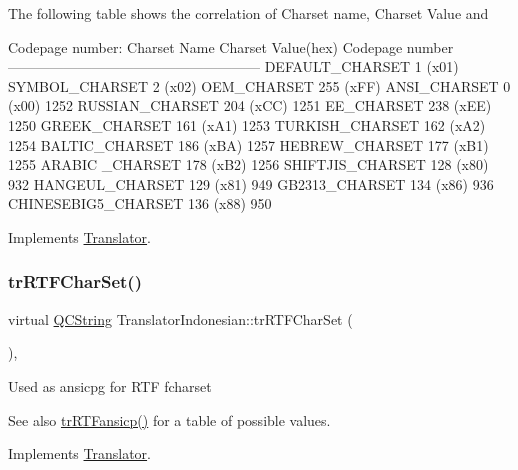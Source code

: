 The following table shows the correlation of Charset name, Charset Value and 
\begin{DoxyPre}
Codepage number:
Charset Name       Charset Value(hex)  Codepage number
------------------------------------------------------
DEFAULT\_CHARSET           1 (x01)
SYMBOL\_CHARSET            2 (x02)
OEM\_CHARSET             255 (xFF)
ANSI\_CHARSET              0 (x00)            1252
RUSSIAN\_CHARSET         204 (xCC)            1251
EE\_CHARSET              238 (xEE)            1250
GREEK\_CHARSET           161 (xA1)            1253
TURKISH\_CHARSET         162 (xA2)            1254
BALTIC\_CHARSET          186 (xBA)            1257
HEBREW\_CHARSET          177 (xB1)            1255
ARABIC \_CHARSET         178 (xB2)            1256
SHIFTJIS\_CHARSET        128 (x80)             932
HANGEUL\_CHARSET         129 (x81)             949
GB2313\_CHARSET          134 (x86)             936
CHINESEBIG5\_CHARSET     136 (x88)             950
\end{DoxyPre}
 

Implements \mbox{\hyperlink{class_translator_a9953a4c0e6a4fc7d017abcd5c2939e0f}{Translator}}.

\mbox{\label{class_translator_indonesian_a8a4a1a26894e827a68fcd9937a9a2ea9}} 
\subsubsection{\texorpdfstring{trRTFCharSet()}{trRTFCharSet()}}
{\footnotesize\ttfamily virtual \mbox{\hyperlink{class_q_c_string}{Q\+C\+String}} Translator\+Indonesian\+::tr\+R\+T\+F\+Char\+Set (\begin{DoxyParamCaption}{ }\end{DoxyParamCaption})\hspace{0.3cm}{\ttfamily [inline]}, {\ttfamily [virtual]}}

Used as ansicpg for R\+TF fcharset \begin{DoxySeeAlso}{See also}
\mbox{\hyperlink{class_translator_indonesian_a7fe8b62fd5171fc48bd92af2766a74ee}{tr\+R\+T\+Fansicp()}} for a table of possible values. 
\end{DoxySeeAlso}


Implements \mbox{\hyperlink{class_translator_afad391f3cbfb5ce6332b7239f8e2049a}{Translator}}.

